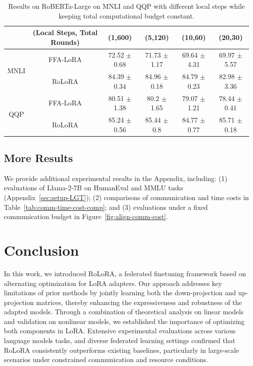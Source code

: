 \documentclass{article}
\newcommand{\com}[1]{\tiny$\pm$#1}
\theoremstyle{plain}
\theoremstyle{definition}
\theoremstyle{remark}
\begin{document}
\begin{table}[h]
    \centering
    {\scriptsize
    \begin{tabular}{cccccc}
    \toprule
         & (Local Steps, Total Rounds)  & (1,600)  & (5,120) & (10,60) & (20,30)\\
         \midrule
        \multirow{2}{*}{MNLI} & FFA-LoRA & 72.52 \com 0.68 & 71.73 \com 1.17  & 69.64 \com 4.31 & 69.97 \com 5.57 \\
         &  \cellcolor{ours} RoLoRA  & \cellcolor{ours}84.39 \com 0.34 &\cellcolor{ours} 84.96 \com 0.18 & \cellcolor{ours}84.79  \com 0.23& \cellcolor{ours} 82.98 \com 3.36\\
         \midrule
       \multirow{2}{*}{QQP}  &  FFA-LoRA & 80.51 \com 1.38  & 80.2 \com 1.65 & 79.07 \com 1.21 & 78.44 \com 0.41\\
         &\cellcolor{ours} RoLoRA & \cellcolor{ours}85.24 \com 0.56 &\cellcolor{ours} 85.44 \com 0.8 &\cellcolor{ours} 84.77 \com 0.77 &\cellcolor{ours} 85.71 \com 0.18\\
         \bottomrule
    \end{tabular}}
    \vspace{4pt}
    \caption{Results on RoBERTa-Large on MNLI and QQP with different local steps while keeping total computational budget constant.}
    \label{tab:ablation-local-steps}
\end{table}
\vspace{-3mm}
\subsection{More Results}We provide additional experimental results in the Appendix, including: (1) evaluations of Llama-2-7B on HumanEval and MMLU tasks (Appendix~\ref{sec:setup-LGT}); (2) comparisons of communication and time costs in Table~\ref{tab:comm-time-cost-comp}; and (3) evaluations under a fixed communication budget in Figure~\ref{fig:align-comm-cost}.

\vspace{-3mm}
\section{Conclusion}
\vspace{-3mm}
In this work, we introduced RoLoRA, a federated finetuning framework based on alternating optimization for LoRA adapters. Our approach addresses key limitations of prior methods by jointly learning both the down-projection and up-projection matrices, thereby enhancing the expressiveness and robustness of the adapted models. Through a combination of theoretical analysis on linear models and validation on nonlinear models, we established the importance of optimizing both components in LoRA. Extensive experimental evaluations across various language models tasks, and diverse federated learning settings confirmed that RoLoRA consistently outperforms existing baselines, particularly in large-scale scenarios under constrained communication and resource conditions.
\end{document}
